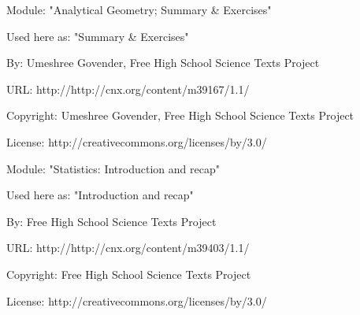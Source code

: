       \par\vspace{9pt}\noindent\begin{minipage}{\textwidth}
      Module: "Analytical Geometry; Summary \& Exercises" \par\nopagebreak\noindent
      Used here as: "Summary \& Exercises" \par\nopagebreak\noindent
        By: Umeshree Govender, Free High School Science Texts Project\par\nopagebreak\noindent
      URL: http://http://cnx.org/content/m39167/1.1/\par\nopagebreak\noindent
      \par\nopagebreak\noindent
      Copyright: Umeshree Govender, Free High School Science Texts Project\par\nopagebreak\noindent
      License:  http://creativecommons.org/licenses/by/3.0/\par\nopagebreak\noindent
      \par\end{minipage}
      \par\vspace{9pt}\noindent\begin{minipage}{\textwidth}
      Module: "Statistics: Introduction and recap" \par\nopagebreak\noindent
      Used here as: "Introduction and recap" \par\nopagebreak\noindent
        By: Free High School Science Texts Project\par\nopagebreak\noindent
      URL: http://http://cnx.org/content/m39403/1.1/\par\nopagebreak\noindent
      \par\nopagebreak\noindent
      Copyright: Free High School Science Texts Project\par\nopagebreak\noindent
      License:  http://creativecommons.org/licenses/by/3.0/\par\nopagebreak\noindent
      \par\end{minipage}
